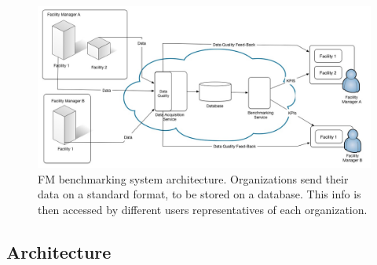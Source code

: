 \begin{figure}[t!]
  \centering
  \includegraphics[width=1\textwidth]{img/OrganizacaoGeral.jpg}
  \caption{FM benchmarking system architecture. Organizations send their data on a standard format, to be stored on a database. This info is then accessed by different users representatives of each organization.}
  \label{fig:architecture}
\end{figure}

\subsection{Architecture}

